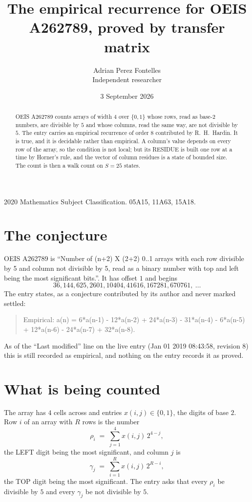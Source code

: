 \documentclass[11pt,a4paper]{article}
\title{The empirical recurrence for OEIS A262789, proved by transfer matrix}
\author{Adrian Perez Fontelles\\ \small Independent researcher}
\date{3 September 2026}
\theoremstyle{plain}
\theoremstyle{definition}
\begin{document}
\maketitle

\begin{abstract}
OEIS A262789 counts arrays of width $4$ over $\{0,1\}$ whose rows, read as base-$2$
numbers, are divisible by $5$ and whose columns, read the same way, are not divisible by
$5$. The entry carries an empirical recurrence of order $8$ contributed by
R.~H.~Hardin. It is true, and it is decidable rather than empirical. A column's value depends on
every row of the array, so the condition is not local; but its RESIDUE is built one row at a
time by Horner's rule, and the vector of column residues is a state of bounded size. The count
is then a walk count on $S=25$ states.
\end{abstract}

\noindent\small 2020 Mathematics Subject Classification. 05A15, 11A63, 15A18.\normalsize

\section{The conjecture}

OEIS A262789 is ``Number of (n+2) X (2+2) 0..1 arrays with each row divisible by 5 and column not divisible by 5, read as a binary number with top and left being the most significant bits.''. It has offset $1$ and begins
\[
36, 144, 625, 2601, 10404, 41616, 167281, 670761,\ \dots
\]
The entry states, as a conjecture contributed by its author and never marked settled:
\begin{quote}
Empirical: a(n) = 6*a(n-1) - 12*a(n-2) + 24*a(n-3) - 31*a(n-4) - 6*a(n-5) + 12*a(n-6) - 24*a(n-7) + 32*a(n-8).
\end{quote}
As of the ``Last modified'' line on the live entry (Jan 01 2019 08:43:58, revision 8) this is still
recorded as empirical, and nothing on the entry records it as proved.

\section{What is being counted}

The array has $4$ cells across and entries $x(i,j)\in\{0,1\}$, the digits of
base $2$. Row $i$ of an array with $R$ rows is the number
\[
\rho_i\;=\;\sum_{j=1}^{4}x(i,j)\,2^{4-j} ,
\]
the LEFT digit being the most significant, and column $j$ is
\[
\gamma_j\;=\;\sum_{i=1}^{R}x(i,j)\,2^{R-i} ,
\]
the TOP digit being the most significant. The entry asks that every $\rho_i$ be divisible by
$5$ and every $\gamma_j$ be not divisible by $5$.
\end{document}
